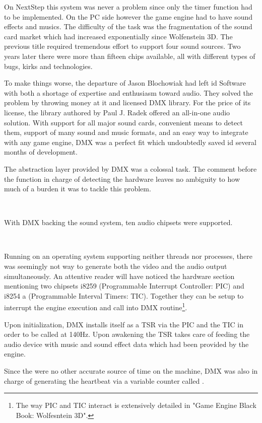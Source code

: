 On NextStep this system was never a problem since only the timer function had to be implemented. On the PC side however the game engine had to have sound effects and musics. The difficulty of the task was the fragmentation of the sound card market which had increased exponentially since Wolfenstein 3D. The previous title required tremendous effort to support four sound sources. Two years later there were more than fifteen chips available, all with different types of bugs, kirks and technologies.\\
\par
To make things worse, the departure of Jason Blochowiak had left id Software with both a shortage of expertise and enthusiasm toward audio. They solved the problem by throwing money at it and licensed DMX library. For the price of its license, the library authored by Paul J. Radek offered an all-in-one audio solution. With support for all major sound cards, convenient means to detect them, support of many sound and music formats, and an easy way to integrate with any game engine, DMX was a perfect fit which undoubtedly saved id several months of development.





The abstraction layer provided by DMX was a colossal task. The comment before the function in charge of detecting the hardware leaves no ambiguity to how much of a burden it was to tackle this problem.\\
\par
{}\\
\par
With DMX backing the sound system, ten audio chipsets were supported.\\
\par
{}\\
\par
Running on an operating system supporting neither threads nor processes, there was seemingly not way to generate both the video and the audio output simultaneously. An attentive reader will have noticed the hardware section mentioning two chipsets i8259 (Programmable Interrupt Controller: PIC) and i8254 a (Programmable Interval Timers: TIC). Together they can be setup to interrupt the engine execution and call into DMX routine\footnote{The way PIC and TIC interact is extensively detailed in "Game Engine Black Book: Wolfesntein 3D".}.\\
\par
Upon initialization, DMX installs itself as a TSR via the PIC and the TIC in order to be called at 140Hz. Upon awakening the TSR takes care of feeding the audio device with music and sound effect data which had been provided by the engine.\\
\par
 Since the were no other accurate source of time on the machine, DMX was also in charge of generating the heartbeat via a variable counter called .
\par


